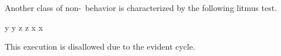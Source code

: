 Another class of non-\mca\ behavior is characterized by the following litmus test.
\begin{displaymathsmall}
  \THEN y \FI \SEMI y
  \PAR
  \THEN z \FI \SEMI z
  \PAR
  \THEN x \FI \SEMI x
\end{displaymathsmall}
\begin{tikzdisplay}[node distance=1em]
\end{tikzdisplay}
This execution is disallowed due to the evident cycle.


